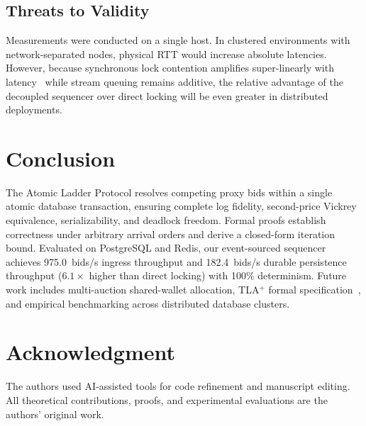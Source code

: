 \documentclass[conference]{IEEEtran}
\begin{document}
\subsection{Threats to Validity}
Measurements were conducted on a single host. In clustered environments with network-separated
nodes, physical RTT would increase absolute latencies. However, because synchronous lock contention
amplifies super-linearly with latency~\cite{Bernstein1987} while stream queuing remains additive,
the relative advantage of the decoupled sequencer over direct locking will be even greater in
distributed deployments.

\section{Conclusion}

The Atomic Ladder Protocol resolves competing proxy bids within a single atomic database
transaction, ensuring complete log fidelity, second-price Vickrey equivalence, serializability,
and deadlock freedom. Formal proofs establish correctness under arbitrary arrival orders and
derive a closed-form iteration bound. Evaluated on PostgreSQL and Redis, our event-sourced
sequencer achieves 975.0~bids/s ingress throughput and 182.4~bids/s durable persistence throughput
($6.1\times$ higher than direct locking) with 100\% determinism. Future work includes multi-auction
shared-wallet allocation, TLA$^+$ formal specification~\cite{Lamport2002}, and empirical benchmarking
across distributed database clusters.

\section*{Acknowledgment}
The authors used AI-assisted tools for code refinement and manuscript editing. All theoretical
contributions, proofs, and experimental evaluations are the authors' original work.

\balance


\end{document}

